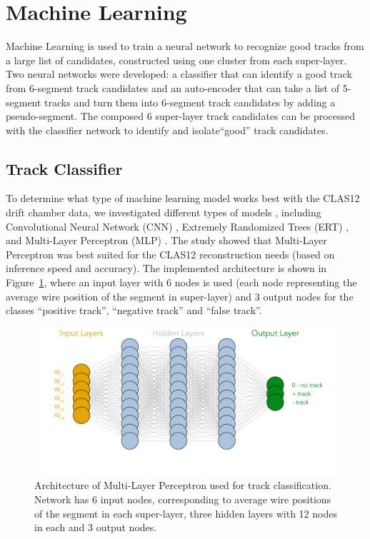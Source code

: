\section{Machine Learning}

Machine Learning is used to train a neural network to recognize good tracks
 from a large list of candidates, constructed using one cluster from each super-layer.
 Two neural networks were developed: a classifier that can identify a good track from  
 6-segment track candidates and an auto-encoder that can take a list of 5-segment tracks 
 and turn them into 6-segment track candidates by adding a pseudo-segment. The composed 
 6 super-layer track candidates can be processed with the classifier network to identify and 
 isolate``good'' track candidates.


 
 \subsection{Track Classifier}
 
 To determine what type of machine learning model works best with the CLAS12 drift chamber data, 
 we investigated different types of models  \cite{Gavalian:2020oxg}, including Convolutional Neural 
 Network (CNN) , Extremely Randomized Trees (ERT) \cite{scikitlearn-extratreesclassifier}, and 
 Multi-Layer Perceptron (MLP) \cite{scikitlearn-mlpclassifier}. The study showed that Multi-Layer 
 Perceptron was best suited for the CLAS12 reconstruction needs (based on inference speed and accuracy). 
 The implemented architecture is shown in Figure~\ref{mlp:architecture}, where an input layer with 6 
 nodes is used (each node representing the average wire position of the segment in super-layer) and 3 
 output nodes for the classes ``positive track'', ``negative track'' and ``false track''.
 
 \begin{figure}[!ht]
\begin{center}
  \includegraphics[width=4.5in]{images/mlp_diagram.pdf}
\caption {Architecture of Multi-Layer Perceptron used for track classification. Network has 6 input nodes,
corresponding to average wire positions of the segment in each super-layer, three hidden layers with 12 nodes 
in each and 3 output nodes.}
 \label{mlp:architecture}
 \end{center}
\end{figure}

